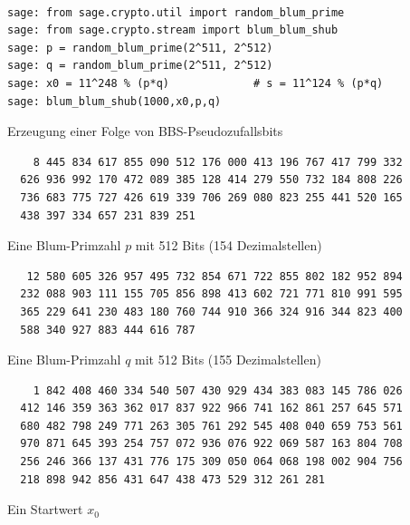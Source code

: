 \begin{refsegment}
\begin{sagecode}
\begin{verbatim}

sage: from sage.crypto.util import random_blum_prime
sage: from sage.crypto.stream import blum_blum_shub
sage: p = random_blum_prime(2^511, 2^512)
sage: q = random_blum_prime(2^511, 2^512)
sage: x0 = 11^248 % (p*q)             # s = 11^124 % (p*q)
sage: blum_blum_shub(1000,x0,p,q)
\end{verbatim}
\caption{Erzeugung einer Folge von BBS-Pseudozufallsbits}\label{Sage-code-bool-bbs}
\end{sagecode}

\begin{table}[hbtp]
\begin{verbatim}
    8 445 834 617 855 090 512 176 000 413 196 767 417 799 332
  626 936 992 170 472 089 385 128 414 279 550 732 184 808 226
  736 683 775 727 426 619 339 706 269 080 823 255 441 520 165
  438 397 334 657 231 839 251
\end{verbatim}
\caption{Eine Blum-Primzahl $p$ mit 512 Bits (154 Dezimalstellen)} \label{tab-bool-bbs-p}
\end{table}

\begin{table}[hbtp]
\begin{verbatim}
   12 580 605 326 957 495 732 854 671 722 855 802 182 952 894
  232 088 903 111 155 705 856 898 413 602 721 771 810 991 595
  365 229 641 230 483 180 760 744 910 366 324 916 344 823 400
  588 340 927 883 444 616 787
\end{verbatim}
\caption{Eine Blum-Primzahl $q$ mit 512 Bits (155 Dezimalstellen)} \label{tab-bool-bbs-q}
\end{table}

\begin{table}[hbtp]
\begin{verbatim}
    1 842 408 460 334 540 507 430 929 434 383 083 145 786 026
  412 146 359 363 362 017 837 922 966 741 162 861 257 645 571
  680 482 798 249 771 263 305 761 292 545 408 040 659 753 561
  970 871 645 393 254 757 072 936 076 922 069 587 163 804 708
  256 246 366 137 431 776 175 309 050 064 068 198 002 904 756
  218 898 942 856 431 647 438 473 529 312 261 281
\end{verbatim}
\caption{Ein Startwert $x_0$} \label{tab-bool-bbs-x0}
\end{table}


\end{refsegment}
